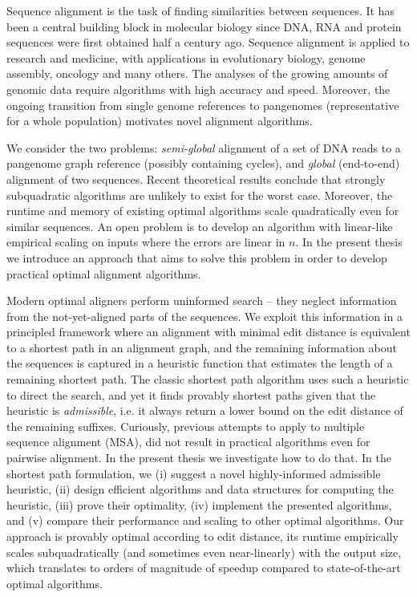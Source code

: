 Sequence alignment is the task of finding similarities between sequences. It has
been a central building block in molecular biology since DNA, RNA and protein
sequences were first obtained half a century ago. Sequence alignment is applied
to research and medicine, with applications in evolutionary biology, genome
assembly, oncology and many others. The analyses of the growing amounts of
genomic data require algorithms with high accuracy and speed. Moreover, the
ongoing transition from single genome references to pangenomes (representative
for a whole population) motivates novel alignment algorithms.

We consider the two problems: \emph{semi-global} alignment of a set of DNA reads
to a pangenome graph reference (possibly containing cycles), and \emph{global}
(end-to-end) alignment of two sequences. Recent theoretical results conclude
that strongly subquadratic algorithms are unlikely to exist for the worst case.
Moreover, the runtime and memory of existing optimal algorithms scale
quadratically even for similar sequences. An open problem is to develop an
algorithm with linear-like empirical scaling on inputs where the errors are
linear in $n$. In the present thesis we introduce an approach that aims to solve
this problem in order to develop practical optimal alignment algorithms.

Modern optimal aligners perform uninformed search -- they neglect information
from the not-yet-aligned parts of the sequences. We exploit this information in
a principled framework where an alignment with minimal edit distance is
equivalent to a shortest path in an alignment graph, and the remaining
information about the sequences is captured in a heuristic function that
estimates the length of a remaining shortest path. The classic shortest path
algorithm \A uses such a heuristic to direct the search, and yet it finds
provably shortest paths given that the heuristic is \emph{admissible}, i.e. it
always return a lower bound on the edit distance of the remaining suffixes.
Curiously, previous attempts to apply \A to multiple sequence alignment (MSA),
did not result in practical algorithms even for pairwise alignment. In the
present thesis we investigate how to do that. In the shortest path formulation,
we (i) suggest a novel highly-informed admissible heuristic, (ii) design
efficient algorithms and data structures for computing the heuristic, (iii)
prove their optimality, (iv) implement the presented algorithms, and (v) compare
their performance and scaling to other optimal algorithms. Our approach is
provably optimal according to edit distance, its runtime empirically scales
subquadratically (and sometimes even near-linearly) with the output size, which
translates to orders of magnitude of speedup compared to state-of-the-art
optimal algorithms.

